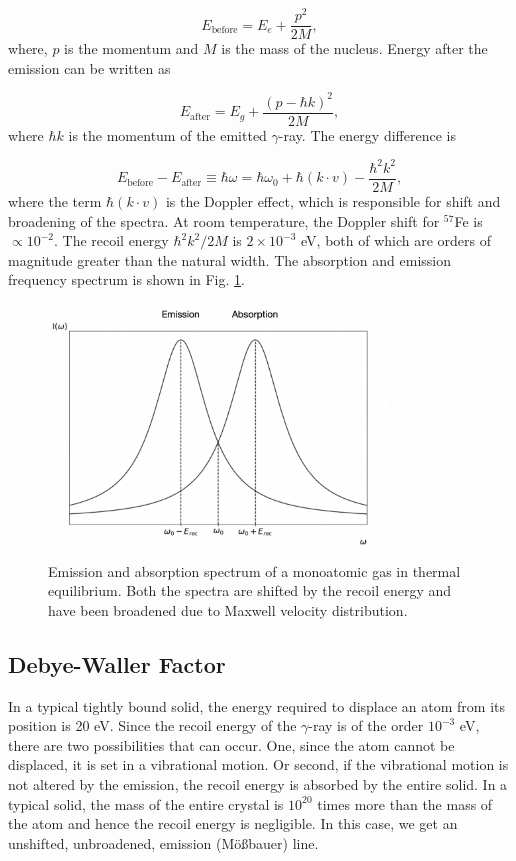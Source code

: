 \documentclass[a4paper]{report}
\numberwithin{equation}{section}
\begin{document}
\begin{equation}
		E_{\mathrm{before}} = E_{e} + \frac{p^2}{2M},
\end{equation}
where, $p$ is the momentum and $M$ is the mass of the nucleus. Energy after the emission can be written as

\begin{equation}
		E_{\mathrm{after}} = E_{g} + \frac{(p - \hbar k)^2}{2M},
\end{equation}
where $\hbar k$ is the momentum of the emitted $\gamma$-ray. The energy difference is 

\begin{equation}
		E_{\mathrm{before}} - E_{\mathrm{after}} \equiv \hbar \omega = \hbar \omega_{0} + \hbar (k \cdot v) - \frac{\hbar ^2 k^2}{2M},
\end{equation}
where the term $\hbar (k \cdot v)$ is the Doppler effect, which is responsible for shift and broadening of the spectra. At room temperature, the Doppler shift for $^{57}$Fe is $\propto 10^{-2}$. The recoil energy $\hbar ^2 k^2 / 2M$ is $2 \times 10^{-3}$ eV, both of which are orders of magnitude greater than the natural width. The absorption and emission frequency spectrum is shown in Fig. \ref{fig:doppler}.

\begin{figure}[htpb]
    \centering
    \includegraphics[width=0.8\textwidth]{doppler}
    \caption{Emission and absorption spectrum of a monoatomic gas in thermal equilibrium. Both the spectra are shifted by the recoil energy and have been broadened due to Maxwell velocity distribution.}
    \label{fig:doppler}
\end{figure}


\subsection{Debye-Waller Factor}
In a typical tightly bound solid, the energy required to displace an atom from its position is 20 eV. Since the recoil energy of the $\gamma$-ray is of the order $10^{-3}$ eV, there are two possibilities that can occur. One, since the atom cannot be displaced, it is set in a vibrational motion. Or second, if the vibrational motion is not altered by the emission, the recoil energy is absorbed by the entire solid. In a typical solid, the mass of the entire crystal is $10^{20}$ times more than the mass of the atom and hence the recoil energy is negligible. In this case, we get an unshifted, unbroadened, emission (M\"o{\ss}bauer) line. 
\end{document}
